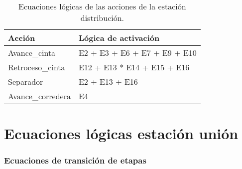 \begin{table}[H]
\begin{center}

\renewcommand{\arraystretch}{1.5}
\begin{tabular}{|M{5cm}|M{8.5cm}|}
\hline
\textbf{Acción} & 
\textbf{Lógica de activación} \\ 
\hline
Avance\_cinta &  E2 + E3 + E6 + E7 + E9 + E10 \\
\hline
Retroceso\_cinta &  E12 + E13 * E14 + E15 + E16 \\
\hline
Separador &  E2 + E13 + E16 \\
\hline
Avance\_corredera &  E4 \\
\hline

\end{tabular}

\caption{Ecuaciones lógicas de las acciones de la estación distribución.}
\label{cuadro:acciones_distribucion}
\end{center}
\end{table}

\section{Ecuaciones lógicas estación unión}
\label{sec:anexo_union}

\subsubsection{Ecuaciones de transición de etapas}

